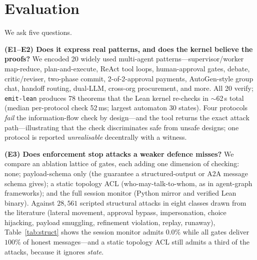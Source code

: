 \documentclass[10pt,twocolumn]{article}
\newcommand{\code}[1]{\texttt{\small #1}}
\begin{document}
\section{Evaluation}

We ask five questions.

\textbf{(E1--E2) Does it express real patterns, and does the kernel believe the proofs?} We encoded 20
widely used multi-agent patterns---supervisor/worker map-reduce, plan-and-execute, ReAct tool loops,
human-approval gates, debate, critic/reviser, two-phase commit, 2-of-2-approval payments, AutoGen-style
group chat, handoff routing, dual-LLM, cross-org procurement, and more. All 20 verify; \code{emit-lean}
produces 78 theorems that the Lean kernel re-checks in $\sim$62\,s total (median per-protocol check
52\,ms; largest automaton 30 states). Four protocols \emph{fail} the information-flow check by design---and
the tool returns the exact attack path---illustrating that the check discriminates safe from unsafe
designs; one protocol is reported \emph{unrealisable} decentrally with a witness.

\textbf{(E3) Does enforcement stop attacks a weaker defence misses?} We compare an ablation lattice of
gates, each adding one dimension of checking: none; payload-schema only (the guarantee a structured-output
or A2A message schema gives); a static topology ACL (who-may-talk-to-whom, as in agent-graph frameworks);
and the full session monitor (Python mirror and verified Lean binary). Against $28{,}561$ scripted
structural attacks in eight classes drawn from the literature (lateral movement, approval bypass,
impersonation, choice hijacking, payload smuggling, refinement violation, replay, runaway), Table~\ref{tab:struct}
shows the session monitor admits $0.0\%$ while all gates deliver $100\%$ of honest messages---and a static
topology ACL still admits a third of the attacks, because it ignores \emph{state}.
\end{document}
